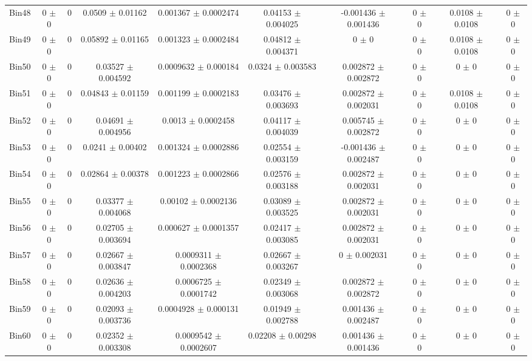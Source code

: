 \begin{tabular}{@{\extracolsep{4pt}}lccccccccc@{}}
     Bin48 & 0 $\pm$ 0 & 0 & 0.0509 $\pm$ 0.01162 & 0.001367 $\pm$ 0.0002474 & 0.04153 $\pm$ 0.004025 & -0.001436 $\pm$ 0.001436 & 0 $\pm$ 0 & 0.0108 $\pm$ 0.0108 & 0 $\pm$ 0 \\ 
     Bin49 & 0 $\pm$ 0 & 0 & 0.05892 $\pm$ 0.01165 & 0.001323 $\pm$ 0.0002484 & 0.04812 $\pm$ 0.004371 & 0 $\pm$ 0 & 0 $\pm$ 0 & 0.0108 $\pm$ 0.0108 & 0 $\pm$ 0 \\ 
     Bin50 & 0 $\pm$ 0 & 0 & 0.03527 $\pm$ 0.004592 & 0.0009632 $\pm$ 0.000184 & 0.0324 $\pm$ 0.003583 & 0.002872 $\pm$ 0.002872 & 0 $\pm$ 0 & 0 $\pm$ 0 & 0 $\pm$ 0 \\ 
     Bin51 & 0 $\pm$ 0 & 0 & 0.04843 $\pm$ 0.01159 & 0.001199 $\pm$ 0.0002183 & 0.03476 $\pm$ 0.003693 & 0.002872 $\pm$ 0.002031 & 0 $\pm$ 0 & 0.0108 $\pm$ 0.0108 & 0 $\pm$ 0 \\ 
     Bin52 & 0 $\pm$ 0 & 0 & 0.04691 $\pm$ 0.004956 & 0.0013 $\pm$ 0.0002458 & 0.04117 $\pm$ 0.004039 & 0.005745 $\pm$ 0.002872 & 0 $\pm$ 0 & 0 $\pm$ 0 & 0 $\pm$ 0 \\ 
     Bin53 & 0 $\pm$ 0 & 0 & 0.0241 $\pm$ 0.00402 & 0.001324 $\pm$ 0.0002886 & 0.02554 $\pm$ 0.003159 & -0.001436 $\pm$ 0.002487 & 0 $\pm$ 0 & 0 $\pm$ 0 & 0 $\pm$ 0 \\ 
     Bin54 & 0 $\pm$ 0 & 0 & 0.02864 $\pm$ 0.00378 & 0.001223 $\pm$ 0.0002866 & 0.02576 $\pm$ 0.003188 & 0.002872 $\pm$ 0.002031 & 0 $\pm$ 0 & 0 $\pm$ 0 & 0 $\pm$ 0 \\ 
     Bin55 & 0 $\pm$ 0 & 0 & 0.03377 $\pm$ 0.004068 & 0.00102 $\pm$ 0.0002136 & 0.03089 $\pm$ 0.003525 & 0.002872 $\pm$ 0.002031 & 0 $\pm$ 0 & 0 $\pm$ 0 & 0 $\pm$ 0 \\ 
     Bin56 & 0 $\pm$ 0 & 0 & 0.02705 $\pm$ 0.003694 & 0.000627 $\pm$ 0.0001357 & 0.02417 $\pm$ 0.003085 & 0.002872 $\pm$ 0.002031 & 0 $\pm$ 0 & 0 $\pm$ 0 & 0 $\pm$ 0 \\ 
     Bin57 & 0 $\pm$ 0 & 0 & 0.02667 $\pm$ 0.003847 & 0.0009311 $\pm$ 0.0002368 & 0.02667 $\pm$ 0.003267 & 0 $\pm$ 0.002031 & 0 $\pm$ 0 & 0 $\pm$ 0 & 0 $\pm$ 0 \\ 
     Bin58 & 0 $\pm$ 0 & 0 & 0.02636 $\pm$ 0.004203 & 0.0006725 $\pm$ 0.0001742 & 0.02349 $\pm$ 0.003068 & 0.002872 $\pm$ 0.002872 & 0 $\pm$ 0 & 0 $\pm$ 0 & 0 $\pm$ 0 \\ 
     Bin59 & 0 $\pm$ 0 & 0 & 0.02093 $\pm$ 0.003736 & 0.0004928 $\pm$ 0.000131 & 0.01949 $\pm$ 0.002788 & 0.001436 $\pm$ 0.002487 & 0 $\pm$ 0 & 0 $\pm$ 0 & 0 $\pm$ 0 \\ 
     Bin60 & 0 $\pm$ 0 & 0 & 0.02352 $\pm$ 0.003308 & 0.0009542 $\pm$ 0.0002607 & 0.02208 $\pm$ 0.00298 & 0.001436 $\pm$ 0.001436 & 0 $\pm$ 0 & 0 $\pm$ 0 & 0 $\pm$ 0 \\ 
\hline\hline
  \end{tabular}
